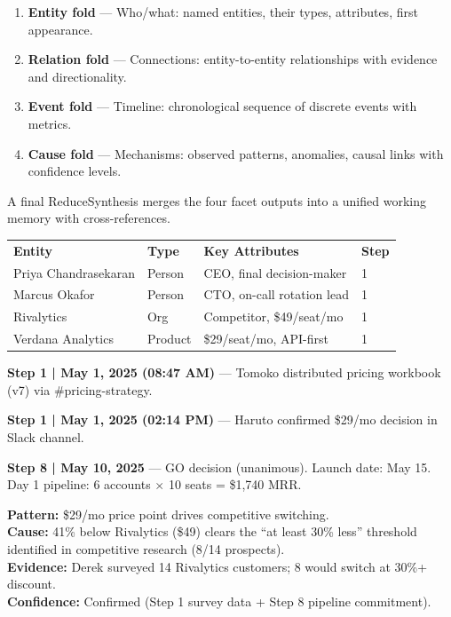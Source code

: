 \documentclass[11pt,a4paper]{article}
\begin{document}
\begin{enumerate}[nosep]
    \item \textbf{Entity fold} --- Who/what: named entities, their types, attributes, first appearance.
    \item \textbf{Relation fold} --- Connections: entity-to-entity relationships with evidence and directionality.
    \item \textbf{Event fold} --- Timeline: chronological sequence of discrete events with metrics.
    \item \textbf{Cause fold} --- Mechanisms: observed patterns, anomalies, causal links with confidence levels.
\end{enumerate}

A final ReduceSynthesis merges the four facet outputs into a unified working memory with cross-references.

\begin{artifactbox}[title=Facet: Entity Register (excerpt)]
\small
\begin{tabular}{@{}llll@{}}
\textbf{Entity} & \textbf{Type} & \textbf{Key Attributes} & \textbf{Step} \\
Priya Chandrasekaran & Person & CEO, final decision-maker & 1 \\
Marcus Okafor & Person & CTO, on-call rotation lead & 1 \\
Rivalytics & Org & Competitor, \$49/seat/mo & 1 \\
Verdana Analytics & Product & \$29/seat/mo, API-first & 1 \\
\end{tabular}
\end{artifactbox}

\begin{artifactbox}[title=Facet: Event Timeline (excerpt)]
\small
\textbf{Step 1 | May 1, 2025 (08:47 AM)} --- Tomoko distributed pricing workbook (v7) via \#pricing-strategy.

\textbf{Step 1 | May 1, 2025 (02:14 PM)} --- Haruto confirmed \$29/mo decision in Slack channel.

\textbf{Step 8 | May 10, 2025} --- GO decision (unanimous). Launch date: May 15.
Day 1 pipeline: 6 accounts $\times$ 10 seats = \$1,740 MRR.
\end{artifactbox}

\begin{artifactbox}[title=Facet: Causal Analysis (excerpt)]
\small
\textbf{Pattern:} \$29/mo price point drives competitive switching.\\
\textbf{Cause:} 41\% below Rivalytics (\$49) clears the ``at least 30\% less'' threshold identified in competitive research (8/14 prospects).\\
\textbf{Evidence:} Derek surveyed 14 Rivalytics customers; 8 would switch at 30\%+ discount.\\
\textbf{Confidence:} Confirmed (Step 1 survey data + Step 8 pipeline commitment).
\end{artifactbox}
\end{document}
